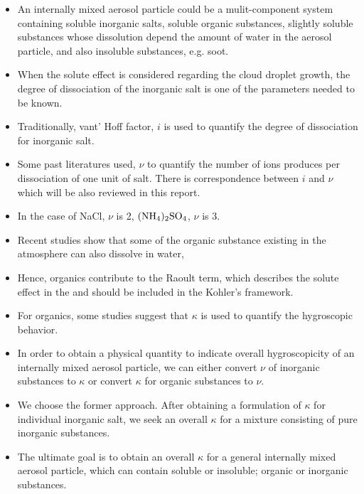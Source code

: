 \documentclass[12pt]{article}
\begin{document}
{\begin{itemize}
\item An internally mixed aerosol particle could be a mulit-component system containing soluble inorganic salts, soluble organic substances, slightly soluble substances whose dissolution depend the amount of water in the aerosol particle, and also insoluble substances, e.g. soot.

\item When the solute effect is considered regarding the cloud droplet growth, the degree of dissociation of the inorganic salt is one of the parameters needed to be known. 

\item Traditionally, vant' Hoff factor, $i$ is used to quantify the degree of dissociation for inorganic salt. 

\item Some past literatures used, $\nu$ to quantify the number of ions produces per dissociation of one unit of salt. There is correspondence between $i$ and $\nu$ which will be also reviewed in this report.

\item  In the case of NaCl, $\nu$ is 2, $\rm (NH_4)_2SO_4$, $\nu$ is 3.

\item Recent studies show that some of the organic substance existing in the atmosphere can also dissolve in water,

\item Hence, organics contribute to the Raoult term, which describes the solute effect in the and should be included in the Kohler's  framework. 

\item For organics, some studies suggest that $\kappa$ is used to quantify the hygroscopic behavior. 


\item In order to obtain a physical quantity to indicate overall hygroscopicity of an internally mixed aerosol particle, we can either convert $\nu$ of inorganic substances to $\kappa$ or convert $\kappa$ for organic substances to $\nu$. 


\item We choose the former approach. After obtaining a formulation of $\kappa$ for individual inorganic salt, we seek an overall $\kappa$ for a mixture consisting of pure inorganic substances. 

\item The ultimate goal is to obtain an overall $\kappa$ for a general internally mixed aerosol particle, which can contain soluble or insoluble; organic or inorganic substances.


\end{itemize}}
\end{document}
